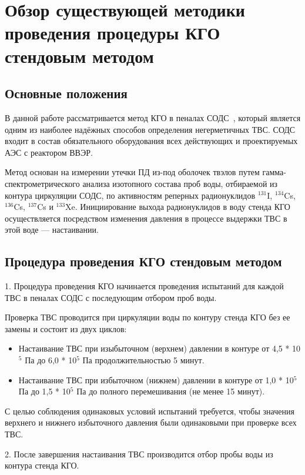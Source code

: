 
\section{Обзор существующей методики проведения процедуры КГО стендовым методом}

\subsection{Основные положения}

В данной работе рассматривается метод КГО в пеналах СОДС~\cite{RD}, который является одним из наиболее надёжных способов определения негерметичных ТВС. СОДС входит в состав обязательного оборудования всех действующих и проектируемых АЭС с реактором ВВЭР.

Метод основан на измерении утечки ПД из-под оболочек твэлов путем гамма-спектрометрического анализа изотопного состава проб воды, отбираемой из контура циркуляции СОДС, по активностям реперных радионуклидов $^{131}$I, $^{134}$Cs, $^{136}$Cs, $^{137}$Cs и $^{133}$Xe. Инициирование выхода радионуклидов в воду стенда КГО осуществляется посредством изменения давления в процессе выдержки ТВС в этой воде --- настаивании.

\subsection{Процедура проведения КГО стендовым методом}
1. Процедура проведения КГО начинается проведения испытаний для каждой ТВС в пеналах СОДС с последующим отбором проб воды. 

Проверка ТВС проводится при циркуляции воды по контуру стенда КГО без ее замены и состоит из двух циклов:
\begin{itemize}
\item Настаивание ТВС при изыбыточном (верхнем) давлении в контуре от 4,5 * 10$^{5}$ Па до 6,0 * 10$^{5}$ Па продолжительностью 5 минут.

\item Настаивание ТВС при избыточном (нижнем) давлении в контуре от 1,0 * 10$^{5}$ Па до 1,5 * 10$^{5}$ Па до полного перемешивания (не менее 15 минут).
\end{itemize}

С целью соблюдения одинаковых условий испытаний требуется, чтобы значения верхнего и нижнего избыточного давления были одинаковыми при проверке всех ТВС. 

2. После завершения настаивания ТВС производится отбор пробы воды из контура стенда КГО.

